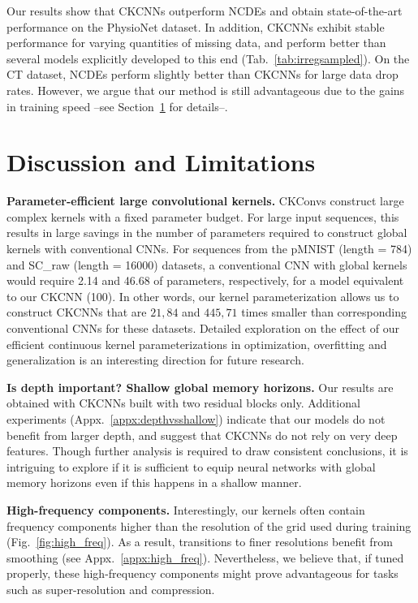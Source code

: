 \documentclass{article}
\begin{document}
Our results show that CKCNNs outperform NCDEs and obtain state-of-the-art performance on the PhysioNet dataset.  In addition, CKCNNs exhibit stable performance for varying quantities of missing data, and perform better than several models explicitly developed to this end (Tab.~\ref{tab:irregsampled}). On the CT dataset, NCDEs perform slightly better than CKCNNs for large data drop rates. However, we argue that our method is still advantageous due to the gains in training speed --see Section~\ref{sec:discussion} for details--.
\vspace{-2mm}
\section{Discussion and Limitations}\label{sec:discussion}
\vspace{-2mm}
\textbf{Parameter-efficient large convolutional kernels.}  CKConvs construct large complex kernels with a fixed parameter budget. For large input sequences, this results in large savings in the number of parameters required to construct global kernels with conventional CNNs. For sequences from the pMNIST (length {=} 784) and SC\_raw (length {=} 16000) datasets, a conventional CNN with global kernels would require 2.14{} and 46.68{} of parameters, respectively, for a model equivalent to our CKCNN (100{}). In other words, our kernel parameterization allows us to construct CKCNNs that are $21,84$ and $445,71$ times smaller than corresponding conventional CNNs for these datasets. 
Detailed exploration on the effect of our efficient  continuous kernel parameterizations in optimization, overfitting and generalization is an interesting direction for future research.

\textbf{Is depth important? Shallow global memory horizons.} Our results are obtained with CKCNNs built with two residual blocks only. Additional experiments (Appx.~\ref{appx:depthvsshallow}) indicate that our models do not benefit from larger depth, and suggest that CKCNNs do not rely on very deep features. Though further analysis is required to draw consistent conclusions, it is intriguing to explore if it is sufficient to equip neural networks with global memory horizons even if this happens in a shallow manner.

\textbf{High-frequency components.} Interestingly, our kernels often contain frequency components higher than the resolution of the grid used during training (Fig.~\ref{fig:high_freq}). As a result, transitions to finer resolutions benefit from smoothing (see Appx.~\ref{appx:high_freq}). Nevertheless, we believe that, if tuned properly, these high-frequency components might prove advantageous for tasks such as super-resolution and compression.
\end{document}
